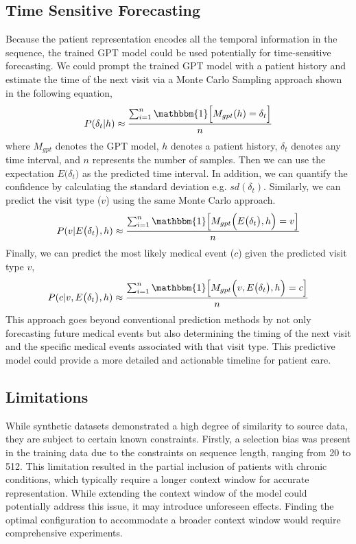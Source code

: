 \begin{multicols}{2}
\subsection{Time Sensitive Forecasting}
Because the patient representation encodes all the temporal information in the sequence, the trained GPT model could be used potentially for time-sensitive forecasting. We could prompt the trained GPT model with a patient history and estimate the time of the next visit via a Monte Carlo Sampling approach shown in the following equation, 
\[
    P(\delta_{t}|h) \approx \frac{\sum^n_{i=1}\mathbbm{1}\Big[M_{gpt}(h) = \delta_{t} \Big]}{n} 
\]
where $M_{gpt}$ denotes the GPT model, $h$ denotes a patient history, $\delta_t$ denotes any time interval, and $n$ represents the number of samples. Then we can use the expectation $E\big(\delta_{t}\big)$ as the predicted time interval. In addition, we can quantify the confidence by calculating the standard deviation e.g. $sd(\delta_{t})$. Similarly, we can predict the visit type ($v$)  using the same Monte Carlo approach.
\[
    P(v|E\big(\delta_{t}\big), h) \approx \frac{\sum^n_{i=1}\mathbbm{1}\Big[M_{gpt}\Big(E\big(\delta_{t}\big), h\Big) = v \Big]}{n} 
\]
Finally, we can predict the most likely medical event ($c$) given the predicted visit type $v$,
\[
    P(c|v, E\big(\delta_{t}\big), h) \approx \frac{\sum^n_{i=1}\mathbbm{1}\Big[M_{gpt}\Big(v, E\big(\delta_{t}\big), h\Big) = c \Big]}{n} 
\]
This approach goes beyond conventional prediction methods by not only forecasting future medical events but also determining the timing of the next visit and the specific medical events associated with that visit type. This predictive model could provide a more detailed and actionable timeline for patient care.

\subsection{Limitations}
While synthetic datasets demonstrated a high degree of similarity to source data, they are subject to certain known constraints. Firstly, a selection bias was present in the training data due to the constraints on sequence length, ranging from 20 to 512. This limitation resulted in the partial inclusion of patients with chronic conditions, which typically require a longer context window for accurate representation. While extending the context window of the model could potentially address this issue, it may introduce unforeseen effects. Finding the optimal configuration to accommodate a broader context window would require comprehensive experiments. 


\end{multicols}
